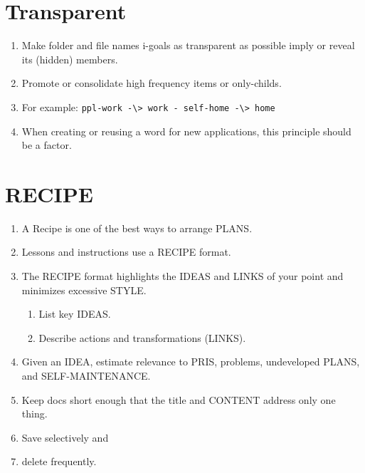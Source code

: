 \documentclass[
]{book}
\providecommand{\tightlist}{%
  \setlength{\itemsep}{0pt}\setlength{\parskip}{0pt}}
\begin{document}
\hypertarget{transparent}{%
\section{Transparent}\label{transparent}}

\begin{enumerate}
\def\labelenumi{\arabic{enumi}.}
\item
  Make folder and file names i-goals as transparent as possible imply
  or reveal its (hidden) members.
\item
  Promote or consolidate high frequency items or only-childs.
\item
  For example: \texttt{ppl-work\ -\textbackslash{}\textgreater{}\ work\ -\ self-home\ -\textbackslash{}\textgreater{}\ home}
\item
  When creating or reusing a word for new applications, this principle
  should be a factor.
\end{enumerate}

\hypertarget{recipe}{%
\section{RECIPE}\label{recipe}}

\begin{enumerate}
\def\labelenumi{\arabic{enumi}.}
\setcounter{enumi}{34}
\tightlist
\item
  A Recipe is one of the best ways to arrange PLANS.
\item
  Lessons and instructions use a RECIPE format.
\item
  The RECIPE format highlights the IDEAS and LINKS of your point and
  minimizes excessive STYLE.

  \begin{enumerate}
  \def\labelenumii{\arabic{enumii}.}
  \tightlist
  \item
    List key IDEAS.
  \item
    Describe actions and transformations (LINKS).
  \end{enumerate}
\item
  Given an IDEA, estimate relevance to PRIS, problems, undeveloped
  PLANS, and SELF-MAINTENANCE.
\item
  Keep docs short enough that the title and CONTENT address only one
  thing.
\item
  Save selectively and
\item
  delete frequently.
\end{enumerate}
\end{document}
